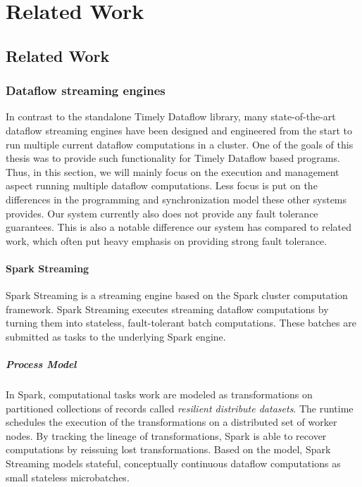 \chapter{Related Work} \label{ch:related}

\section{Related Work}

\subsection{Dataflow streaming engines}

In contrast to the standalone Timely Dataflow library, many state-of-the-art
dataflow streaming engines have been designed and engineered from the start
to run multiple current dataflow computations in a cluster. One of the
goals of this thesis was to provide such functionality for Timely Dataflow
based programs. Thus, in this section, we will mainly focus on the execution
and management aspect running multiple dataflow computations. Less focus is
put on the differences in the programming and synchronization model these 
other systems provides. Our system currently also does not provide any fault
tolerance guarantees. This is also a notable difference our system has compared
to related work, which often put heavy emphasis on providing strong fault
tolerance.

\subsubsection{Spark Streaming}

Spark Streaming \cite{sparkstreaming} is a streaming engine based on the Spark
cluster computation framework. Spark Streaming executes streaming dataflow
computations by turning them into stateless, fault-tolerant batch computations.
These batches are submitted as tasks to the underlying Spark engine. \cite{spark} 

\paragraph{Process Model}

In Spark, computational tasks work are modeled as transformations on partitioned
collections of records called \emph{resilient distribute datasets}. The
runtime schedules the execution of the transformations on a distributed set of
worker nodes. By tracking the lineage of transformations, Spark is able to
recover computations by reissuing lost transformations. Based on the model,
Spark Streaming models stateful, conceptually continuous dataflow computations
as small stateless microbatches.

